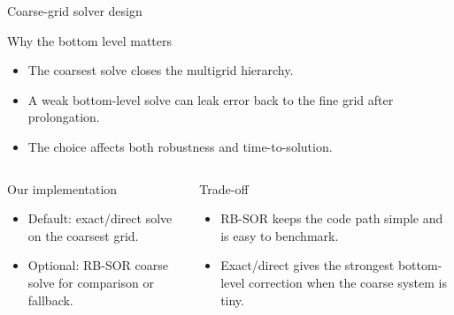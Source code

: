 \documentclass[aspectratio=169]{beamer}
\newcommand{\frametitlesub}[2]{#2}
\begin{document}
\begin{frame}[t]{\frametitlesub{Coarse-grid solve and cost}{Coarse-grid solver design}}
    \footnotesize
    \begin{block}{Why the bottom level matters}
        \begin{itemize}
            \item The coarsest solve closes the multigrid hierarchy.
            \item A weak bottom-level solve can leak error back to the fine grid after prolongation.
            \item The choice affects both robustness and time-to-solution.
        \end{itemize}
    \end{block}

    \begin{columns}[T,onlytextwidth]
        \begin{block}{Our implementation}
            \begin{itemize}
                \item Default: exact/direct solve on the coarsest grid.
                \item Optional: RB-SOR coarse solve for comparison or fallback.
            \end{itemize}
        \end{block}

        \begin{block}{Trade-off}
            \begin{itemize}
                \item RB-SOR keeps the code path simple and is easy to benchmark.
                \item Exact/direct gives the strongest bottom-level correction when the coarse system is tiny.
            \end{itemize}
        \end{block}
    \end{columns}
\end{frame}
\end{document}
